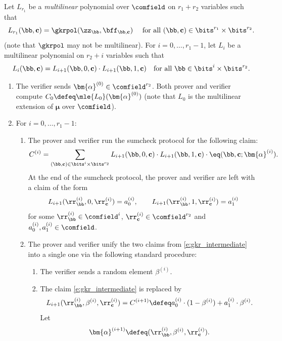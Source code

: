 \begin{construction}
Let $L_{r_1}$ be a  \emph{multilinear} polynomial over $\comfield$ on $r_1 + r_2$ variables such that $$L_{r_1}(\bb,\cc)= \gkrpol(\zz_{\bb}, \bff_{\bb,\cc}) \quad  \text{ for all } (\bb,\cc) \in \bits^{r_1} \times \bits^{r_2}.$$ (note that $\gkrpol$ may not be multilinear).  
     For $i=0,\ldots, r_1-1$, let $L_i$ be a multilinear polynomial on $r_2 + i$ variables  such that 
      $$
  L_{i}(\bb,\cc)  =  L_{i+1}(\bb,0,\cc) \cdot L_{i+1}(\bb,1, \cc)  \quad \text{for all } \bb\in \bits^{i} \times \bits^{r_2}.
    $$
\begin{enumerate}[leftmargin=*]
    \item The verifier sends $\bm{\alpha}^{(0)}\in \comfield^{r_2}$. Both prover and verifier compute $C_0\defeq \mle{L_0}(\bm{\alpha}^{(0)})$ (note that $L_0$ is the multilinear extension of $\bm{\mu}$ over $\comfield$). 
    \item  For $i=0,\ldots, r_1-1$:
    \begin{enumerate}[leftmargin=*]
        \item The prover and verifier run the sumcheck protocol for the following claim:
    $$
    C^{(i)} =  \sum_{(\bb,\cc)\in \bits^i \times \bits^{r_2}}  L_{i+1}(\bb,0,\cc) \cdot L_{i+1}(\bb,1,\cc) \cdot \eq(\bb, \cc; \bm{\alpha}^{(i)}). 
    $$
    At the end of the sumcheck protocol, the prover and verifier are left with a claim of the form
    \begin{equation}\label{e:gkr_intermediate}
    L_{i+1}(\rr_\bb^{(i)},0,\rr_{\cc}^{(i)}) = a_{0}^{(i)}, \qquad L_{i+1}(\rr_\bb^{(i)},1,\rr_{\cc}^{(i)}) = a_{1}^{(i)}
    \end{equation}
    for some $\rr_\bb^{(i)}\in \comfield^{i}$, $\rr_\cc^{(i)}\in \comfield^{r_2}$ and $a_{0}^{(i)},a_{1}^{(i)}\in \comfield$.
    \item The prover and verifier unify the two claims from \eqref{e:gkr_intermediate} into a single one via the following standard procedure:
    \begin{enumerate}[leftmargin=*]
        \item The verifier sends a random element $\beta^{(i)}$.
        \item The claim \eqref{e:gkr_intermediate} is replaced by
        $$
        L_{i+1}(\rr_\bb^{(i)},\beta^{(i)},\rr_{\cc}^{(i)}) = C^{(i+1)} \defeq a_0^{(i)} \cdot (1-\beta^{(i)}) + a_1^{(i)} \cdot \beta^{(i)}.
        $$
        Let 
        $$
        \bm{\alpha}^{(i+1)} \defeq (\rr_\bb^{(i)},\beta^{(i)},\rr_{\cc}^{(i)}).
        $$
    \end{enumerate}

\end{enumerate}
\end{enumerate}
\end{construction}
